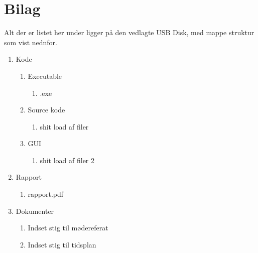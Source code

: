 \appendix
\section{Bilag} \hfill
Alt der er listet her under ligger på den vedlagte USB Disk, med mappe struktur som vist nednfor.

\begin{enumerate}[noitemsep]
	\item Kode
	\begin{enumerate}[noitemsep]
		\item Executable
		\begin{enumerate}[noitemsep]
			\item .exe
		\end{enumerate}
		\item Source kode
		\begin{enumerate}[noitemsep]
			\item shit load af filer
		\end{enumerate}
		\item GUI
		\begin{enumerate}
			\item shit load af filer 2
		\end{enumerate}
	\end{enumerate}
	\item Rapport
	\begin{enumerate}[noitemsep]
		\item rapport.pdf
	\end{enumerate}
	\item Dokumenter
	\begin{enumerate}[noitemsep]
		\item Indset stig til mødereferat \label{itm:Modereferat1}
		\item Indset stig til tidsplan \label{itm:Tidsplan1}
	\end{enumerate}
\end{enumerate}